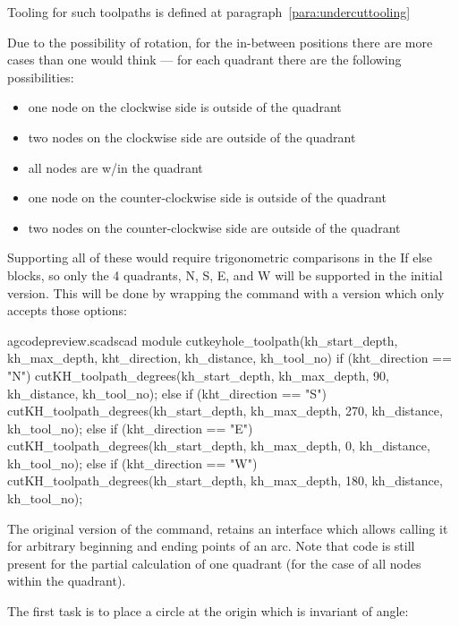 \documentclass{ltxdoc}
\begin{document}
Tooling for such toolpaths is defined at paragraph~\ref{para:undercuttooling}

Due to the possibility of rotation, for the in-between positions there are more cases 
than one would think — for each quadrant there are the following possibilities:

\begin{itemize}
 \item one node on the clockwise side is outside of the quadrant
 \item two nodes on the clockwise side are outside of the quadrant
 \item all nodes are w/in the quadrant
 \item one node on the counter-clockwise side is outside of the quadrant
 \item two nodes on the counter-clockwise side are outside of the quadrant
\end{itemize}
 
Supporting all of these would require trigonometric comparisons in the If else blocks, 
so only the 4 quadrants, N, S, E, and W will be supported in the initial version. 
This will be done by wrapping the command with a version which only accepts those options: 

\lstset{firstnumber=\thegcpscad}
\begin{writecode}{a}{gcodepreview.scad}{scad}
module cutkeyhole_toolpath(kh_start_depth, kh_max_depth, kht_direction, kh_distance, kh_tool_no) {   
if (kht_direction == "N") {
  cutKH_toolpath_degrees(kh_start_depth, kh_max_depth, 90, kh_distance, kh_tool_no);
    } else if (kht_direction == "S") {
  cutKH_toolpath_degrees(kh_start_depth, kh_max_depth, 270, kh_distance, kh_tool_no);
    } else if (kht_direction == "E") {
  cutKH_toolpath_degrees(kh_start_depth, kh_max_depth, 0, kh_distance, kh_tool_no);
    } else if (kht_direction == "W") {
  cutKH_toolpath_degrees(kh_start_depth, kh_max_depth, 180, kh_distance, kh_tool_no);
    }
}

\end{writecode}
\addtocounter{gcpscad}{12}
 
The original version of the command,  retains 
an interface which allows calling it for arbitrary beginning and ending points of an arc. 
Note that code is still present for the partial calculation of one quadrant (for the case of 
all nodes within the quadrant).

The first task is to place a circle at the origin which is invariant of angle:
 
\end{document}
